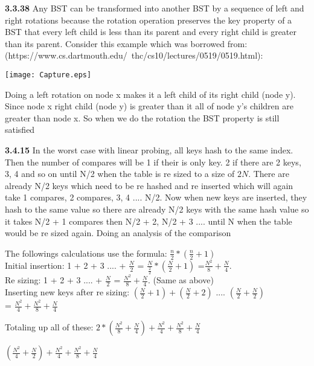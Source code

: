 \documentclass[12pt]{article}
\begin{document}
\begin{itemize}
\begin{enumerate}
\end{enumerate}

\textbf{3.3.38} Any BST can be transformed into another BST by a sequence of left and right rotations because the rotation operation preserves the key property of a BST that every left child is less than its parent and every right child is greater than its parent. Consider this example which was borrowed from:\\
 (https://www.cs.dartmouth.edu/~thc/cs10/lectures/0519/0519.html):

\texttt{[image: Capture.eps]}

Doing a left rotation on node x makes it a left child of its right child (node y). Since node x right child (node y) is greater than it all of node y's children are greater than node x. So when we do the rotation the BST property is still satisfied


\textbf{3.4.15} In the worst case with linear probing, all keys hash to the same index. Then the number of compares will be 1 if their is only key. 2 if there are 2 keys, 3, 4 and so on until N/2 when the table is re sized to a size of $2N$. There are already N/2 keys which need to be re hashed and re inserted which will again take 1 compares, 2 compares, 3, 4 .... N/2. Now when new keys are inserted, they hash to the same value so there are already N/2 keys with the same hash value so it takes N/2 + 1 compares then N/2 + 2, N/2 + 3 .... until N when the table would be re sized again. Doing an analysis of the comparison

The followings calculations use the formula: $\frac{n}{2}*(\frac{n}{2} + 1)$\\

Initial insertion: 1 + 2 + 3 .... + $\frac{N}{2}$ = $\frac{N}{\frac{2}{2}}*(\frac{N}{2} + 1)$
=$\frac{N^2}{8} + \frac{N}{4}$.\\

Re sizing: 1 + 2 + 3 .... + $\frac{N}{2}$ = $\frac{N^2}{8} + \frac{N}{4}$. (Same as above)\\

Inserting new keys after re sizing: $(\frac{N}{2} + 1) + (\frac{N}{2} + 2)$ .... $(\frac{N}{2} + \frac{N}{2})$\\
= $\frac{N^2}{4} + \frac{N^2}{8} + \frac{N}{4}$

Totaling up all of these: 
$2*(\frac{N^2}{8} + \frac{N}{4}) + \frac{N^2}{4} + \frac{N^2}{8} + \frac{N}{4}$

$(\frac{N^2}{4} + \frac{N}{2}) + \frac{N^2}{4} + \frac{N^2}{8} + \frac{N}{4}$


\end{itemize}
\end{document}
